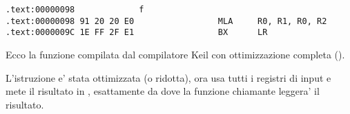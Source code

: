 \subsectionold{\OptimizingKeilVI (\ARMMode)}

\begin{lstlisting}[label=ARM_leaf_example1]
.text:00000098             f
.text:00000098 91 20 20 E0                 MLA     R0, R1, R0, R2
.text:0000009C 1E FF 2F E1                 BX      LR
\end{lstlisting}


Ecco la funzione \ttf compilata dal compilatore Keil con ottimizzazione completa (\Othree).

L'istruzione \MOV e' stata ottimizzata (o ridotta), ora  usa tutti i registri di input e mete il risultato in , esattamente da dove
la funzione chiamante leggera' il risultato.
